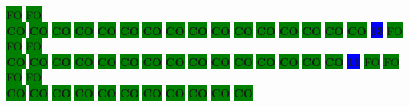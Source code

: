 \colorbox{green}{\color[gray]{0.75}FO}%
\colorbox{green}{\color[gray]{0.75}FO}%
\\
\colorbox{green}{\color[rgb]{0,0,0}\textbf{CO}}%
\colorbox{green}{\color[rgb]{0,0,0}\textbf{CO}}%
\colorbox{green}{\color[rgb]{0,0,0}\textbf{CO}}%
\colorbox{green}{\color[rgb]{0,0,0}\textbf{CO}}%
\colorbox{green}{\color[rgb]{0,0,0}\textbf{CO}}%
\colorbox{green}{\color[rgb]{0,0,0}\textbf{CO}}%
\colorbox{green}{\color[rgb]{0,0,0}\textbf{CO}}%
\colorbox{green}{\color[rgb]{0,0,0}\textbf{CO}}%
\colorbox{green}{\color[rgb]{0,0,0}\textbf{CO}}%
\colorbox{green}{\color[rgb]{0,0,0}\textbf{CO}}%
\colorbox{green}{\color[rgb]{0,0,0}\textbf{CO}}%
\colorbox{green}{\color[rgb]{0,0,0}\textbf{CO}}%
\colorbox{green}{\color[rgb]{0,0,0}\textbf{CO}}%
\colorbox{green}{\color[rgb]{0,0,0}\textbf{CO}}%
\colorbox{green}{\color[rgb]{0,0,0}\textbf{CO}}%
\colorbox{green}{\color[rgb]{0,0,0}\textbf{CO}}%
\colorbox{blue}{\color[rgb]{1,0,0}\textbf{13}}%
\colorbox{green}{\color[gray]{0.75}FO}%
\colorbox{green}{\color[gray]{0.75}FO}%
\colorbox{green}{\color[gray]{0.75}FO}%
\\
\colorbox{green}{\color[rgb]{0,0,0}\textbf{CO}}%
\colorbox{green}{\color[rgb]{0,0,0}\textbf{CO}}%
\colorbox{green}{\color[rgb]{0,0,0}\textbf{CO}}%
\colorbox{green}{\color[rgb]{0,0,0}\textbf{CO}}%
\colorbox{green}{\color[rgb]{0,0,0}\textbf{CO}}%
\colorbox{green}{\color[rgb]{0,0,0}\textbf{CO}}%
\colorbox{green}{\color[rgb]{0,0,0}\textbf{CO}}%
\colorbox{green}{\color[rgb]{0,0,0}\textbf{CO}}%
\colorbox{green}{\color[rgb]{0,0,0}\textbf{CO}}%
\colorbox{green}{\color[rgb]{0,0,0}\textbf{CO}}%
\colorbox{green}{\color[rgb]{0,0,0}\textbf{CO}}%
\colorbox{green}{\color[rgb]{0,0,0}\textbf{CO}}%
\colorbox{green}{\color[rgb]{0,0,0}\textbf{CO}}%
\colorbox{green}{\color[rgb]{0,0,0}\textbf{CO}}%
\colorbox{green}{\color[rgb]{0,0,0}\textbf{CO}}%
\colorbox{blue}{\color[rgb]{1,0,0}\textbf{11}}%
\colorbox{green}{\color[gray]{0.75}FO}%
\colorbox{green}{\color[gray]{0.75}FO}%
\colorbox{green}{\color[gray]{0.75}FO}%
\colorbox{green}{\color[gray]{0.75}FO}%
\\
\colorbox{green}{\color[rgb]{0,0,0}\textbf{CO}}%
\colorbox{green}{\color[rgb]{0,0,0}\textbf{CO}}%
\colorbox{green}{\color[rgb]{0,0,0}\textbf{CO}}%
\colorbox{green}{\color[rgb]{0,0,0}\textbf{CO}}%
\colorbox{green}{\color[rgb]{0,0,0}\textbf{CO}}%
\colorbox{green}{\color[rgb]{0,0,0}\textbf{CO}}%
\colorbox{green}{\color[rgb]{0,0,0}\textbf{CO}}%
\colorbox{green}{\color[rgb]{0,0,0}\textbf{CO}}%
\colorbox{green}{\color[rgb]{0,0,0}\textbf{CO}}%
\colorbox{green}{\color[rgb]{0,0,0}\textbf{CO}}%
\colorbox{green}{\color[rgb]{0,0,0}\textbf{CO}}%
